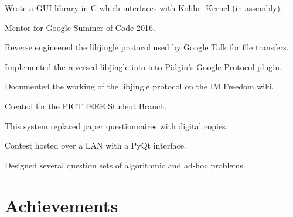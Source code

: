 \documentclass[letterpaper]{deedy-resume} %
\begin{document}
\begin{minipage}[t]{0.66\textwidth}
\begin{tightitemize}
\item Wrote a GUI library in C which interfaces with Kolibri Kernel (in assembly).
\item Mentor for Google Summer of Code 2016.
\end{tightitemize}
\sectionspace %
\begin{tightitemize}
\item Reverse engineered the libjingle protocol used by Google Talk for file transfers.
\item Implemented the reversed libjingle into into Pidgin's Google Protocol plugin.
\item Documented the working of the libjingle protocol on the IM Freedom wiki.
\end{tightitemize}
\sectionspace %
\begin{tightitemize}
\item Created for the PICT IEEE Student Branch.
\item This system replaced paper questionnaires with digital copies.
\item Contest hosted over a LAN with a PyQt interface.
\item Designed several question sets of algorithmic and ad-hoc problems.
\end{tightitemize}
\sectionspace %
\section{Achievements}
\sectionspace %
\sectionspace %
\end{minipage} %
\end{document}
